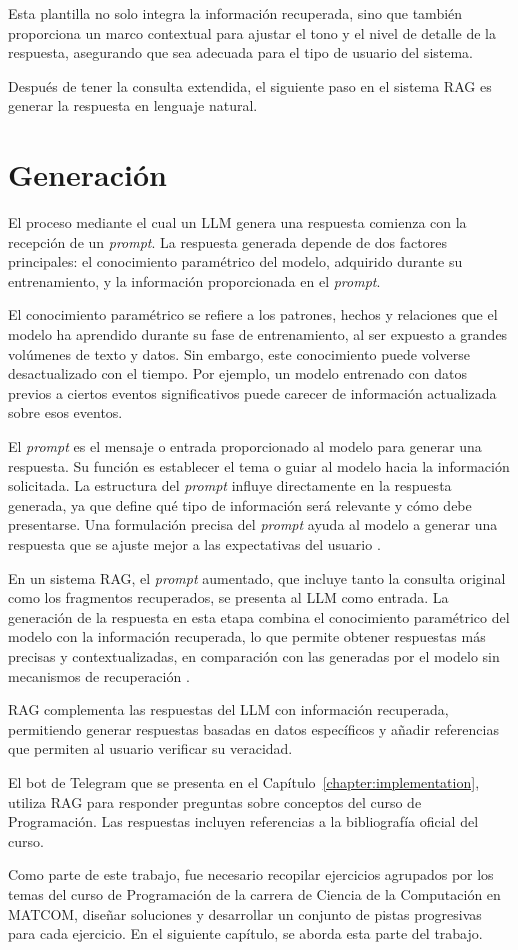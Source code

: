 Esta plantilla no solo integra la información recuperada, sino que también proporciona un marco contextual para ajustar el tono y el nivel de detalle de la respuesta, asegurando que sea adecuada para el tipo de usuario del sistema.

Después de tener la consulta extendida, el siguiente paso en el sistema RAG es generar la respuesta en lenguaje natural.

\section{Generación}

El proceso mediante el cual un LLM genera una respuesta comienza con la recepción de un \textit{prompt}. La respuesta generada depende de dos factores principales: el conocimiento paramétrico del modelo, adquirido durante su entrenamiento, y la información proporcionada en el \textit{prompt}.

El conocimiento paramétrico se refiere a los patrones, hechos y relaciones que el modelo ha aprendido durante su fase de entrenamiento, al ser expuesto a grandes volúmenes de texto y datos. Sin embargo, este conocimiento puede volverse desactualizado con el tiempo. Por ejemplo, un modelo entrenado con datos previos a ciertos eventos significativos puede carecer de información actualizada sobre esos eventos.

El \textit{prompt} es el mensaje o entrada proporcionado al modelo para generar una respuesta. Su función es establecer el tema o guiar al modelo hacia la información solicitada. La estructura del \textit{prompt} influye directamente en la respuesta generada, ya que define qué tipo de información será relevante y cómo debe presentarse. Una formulación precisa del \textit{prompt} ayuda al modelo a generar una respuesta que se ajuste mejor a las expectativas del usuario \cite{sahoo2024systematicsurveypromptengineering}.

En un sistema RAG, el \textit{prompt} aumentado, que incluye tanto la consulta original como los fragmentos recuperados, se presenta al LLM como entrada. La generación de la respuesta en esta etapa combina el conocimiento paramétrico del modelo con la información recuperada, lo que permite obtener respuestas más precisas y contextualizadas, en comparación con las generadas por el modelo sin mecanismos de recuperación \cite{gao2024retrievalaugmentedgenerationlargelanguage}.

RAG complementa las respuestas del LLM con información recuperada, permitiendo generar respuestas basadas en datos específicos y añadir referencias que permiten al usuario verificar su veracidad. 

El bot de Telegram que se presenta en el Capítulo~\ref{chapter:implementation}, utiliza RAG para responder preguntas sobre conceptos del curso de Programación. Las respuestas incluyen referencias a la bibliografía oficial del curso.

Como parte de este trabajo, fue necesario recopilar ejercicios agrupados por los temas del curso de Programación de la carrera de Ciencia de la Computación en \mbox{MATCOM}, diseñar soluciones y desarrollar un conjunto de pistas progresivas para cada ejercicio. En el siguiente capítulo, se aborda esta parte del trabajo.